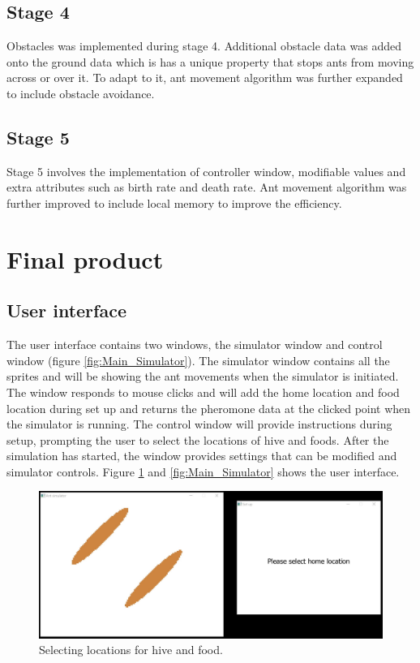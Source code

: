 \documentclass[a4paper, oneside, 11pt]{report}
\begin{document}
\subsection{Stage 4}
Obstacles was implemented during stage 4. Additional obstacle data was added onto the ground data which is has a unique property that stops ants from moving across or over it. To adapt to it, ant movement algorithm was further expanded to include obstacle avoidance.

\subsection{Stage 5}
Stage 5 involves the implementation of controller window, modifiable values and extra attributes such as birth rate and death rate. Ant movement algorithm was further improved to include local memory to improve the efficiency.

\section{Final product}
\subsection{User interface}
The user interface contains two windows, the simulator window and control window (figure \ref{fig:Main_Simulator}). The simulator window contains all the sprites and will be showing the ant movements when the simulator is initiated. The window responds to mouse clicks and will add the home location and food location during set up and returns the pheromone data at the clicked point when the simulator is running. The control window will provide instructions during setup, prompting the user to select the locations of hive and foods. After the simulation has started, the window provides settings that can be modified and simulator controls. Figure \ref{fig:Location_Selection} and \ref{fig:Main_Simulator} shows the user interface.
\begin{figure}[htb]
	\begin{center}
		\includegraphics[width=1.0 \columnwidth]{Location_Selection.jpg}
		\caption{Selecting locations for hive and food.}
		\label{fig:Location_Selection}
	\end{center}
\end{figure}
\end{document}
